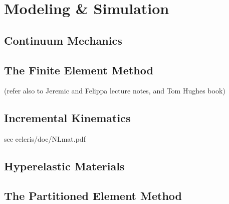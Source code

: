 \chapter{Modeling \& Simulation}
%


\section{Continuum Mechanics}
\label{Continuum Mechanics}
\section{The Finite Element Method}
\label{The Finite Element Method}
(refer also to Jeremic and Felippa lecture notes, and Tom Hughes book)
\section{Incremental Kinematics}
\label{Incremental Kinematics}
see celeris/doc/NLmat.pdf
\section{Hyperelastic Materials}
\label{Hyperelastic Materials}
\section{The Partitioned Element Method}
\label{The Partitioned Element Method}
